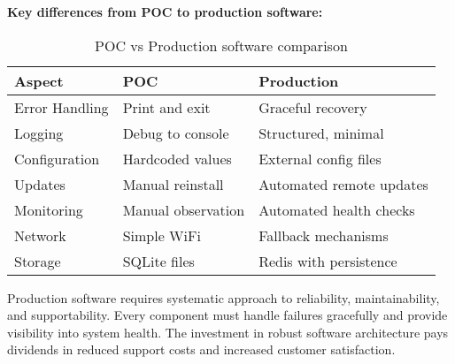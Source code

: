 \textbf{Key differences from POC to production software:}

\begin{table}[h]
\centering
\begin{tabular}{|l|p{3cm}|p{3cm}|}
\hline
\textbf{Aspect} & \textbf{POC} & \textbf{Production} \\
\hline
Error Handling & Print and exit & Graceful recovery \\
Logging & Debug to console & Structured, minimal \\
Configuration & Hardcoded values & External config files \\
Updates & Manual reinstall & Automated remote updates \\
Monitoring & Manual observation & Automated health checks \\
Network & Simple WiFi & Fallback mechanisms \\
Storage & SQLite files & Redis with persistence \\
\hline
\end{tabular}
\caption{POC vs Production software comparison}
\end{table}

Production software requires systematic approach to reliability, maintainability, and supportability. Every component must handle failures gracefully and provide visibility into system health. The investment in robust software architecture pays dividends in reduced support costs and increased customer satisfaction.